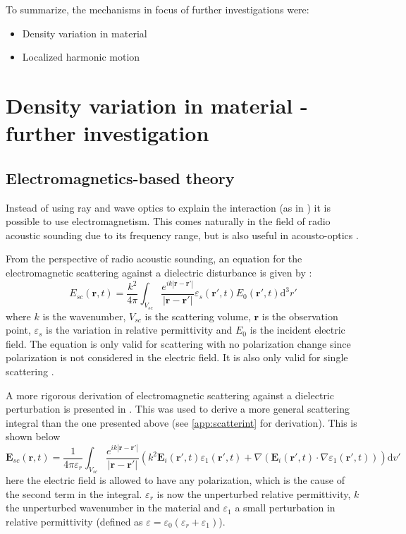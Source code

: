 \documentclass[10pt,a4paper,draft]{scrartcl}
\begin{document}
	To summarize, the mechanisms in focus of further investigations were:
	\begin{itemize}
		\item Density variation in material
		\item Localized harmonic motion
	\end{itemize}
	
	\section{Density variation in material - further investigation}
	
	\subsection{Electromagnetics-based theory}
	Instead of using ray and wave optics to explain the interaction (as in \cite{Saleh2007}) it is possible to use electromagnetism. This comes naturally in the field of radio acoustic sounding due to its frequency range, but is also useful in acousto-optics \cite{Korpel1988}. 
	
	From the perspective of radio acoustic sounding, an equation for the electromagnetic scattering against a dielectric disturbance is given by \cite{Gurvich1987}:
	\begin{equation*}
	E_{sc}(\bm{r},t) = \frac{k^2}{4\pi} \int_{V_{sc}} \frac{e^{ik \left| \bm{r}-\bm{r'} \right| }}{ \left| \bm{r}-\bm{r'} \right| } \varepsilon_s (\bm{r'},t) E_0 (\bm{r'},t) \mathrm{d}^3r'
	\end{equation*}
	where $k$ is the wavenumber, $V_{sc}$ is the scattering volume, $\bm{r}$ is the observation point, $\varepsilon_s$ is the variation in relative permittivity and $E_0$ is the incident electric field. The equation is only valid for scattering with no polarization change since polarization is not considered in the electric field. It is also only valid for single scattering \cite{Gurvich1987}.
	
	A more rigorous derivation of electromagnetic scattering against a dielectric perturbation is presented in \cite{Tatarskii1971}. This was used to derive a more general scattering integral than the one presented above (see \ref{app:scatterint} for derivation). This is shown below
	\begin{equation*}
		\bm{E}_{sc}(\bm{r},t) = \frac{1}{4\pi\varepsilon_r} \int_{V_{sc}} \frac{e^{ik |\bm{r}-\bm{r'}| }}{ |\bm{r}-\bm{r'}|} \left( k^2 \bm{E}_i (\bm{r'},t) \varepsilon_1 (\bm{r'},t) + \nabla (\bm{E}_i (\bm{r'},t) \cdot \nabla \varepsilon_1 (\bm{r'},t)) \right) \mathrm{d}v'
	\end{equation*}
	here the electric field is allowed to have any polarization, which is the cause of the second term in the integral. $\varepsilon_r$ is now the unperturbed relative permittivity, $k$ the unperturbed wavenumber in the material and $\varepsilon_1$ a small perturbation in relative permittivity (defined as $\varepsilon = \varepsilon_0(\varepsilon_r + \varepsilon_1)$).
	
\end{document}

